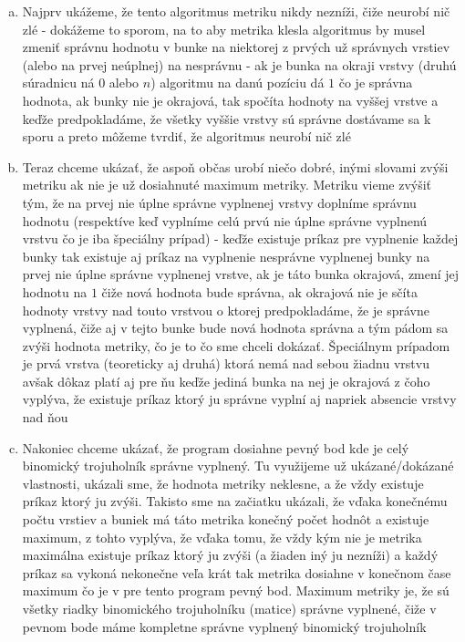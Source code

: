 \documentclass[a4paper]{article}
\begin{document}
\begin{enumerate}[a)]
	\item Najprv ukážeme, že tento algoritmus metriku nikdy nezníži, čiže neurobí nič zlé - dokážeme to sporom, na to aby metrika klesla algoritmus by musel zmeniť správnu hodnotu v bunke na niektorej z prvých už správnych vrstiev (alebo na prvej neúplnej) na nesprávnu - ak je bunka na okraji vrstvy (druhú súradnicu ná $0$ alebo $n$) algoritmu na danú pozíciu dá $1$ čo je správna hodnota, ak bunky nie je okrajová, tak spočíta hodnoty na vyššej vrstve a keďže predpokladáme, že všetky vyššie vrstvy sú správne dostávame sa k sporu a preto môžeme tvrdiť, že algoritmus neurobí nič zlé
	\item Teraz chceme ukázať, že aspoň občas urobí niečo dobré, inými slovami zvýši metriku ak nie je už dosiahnuté maximum metriky. Metriku vieme zvýšiť tým, že na prvej nie úplne správne vyplnenej vrstvy doplníme správnu hodnotu (respektíve keď vyplníme celú prvú nie úplne správne vyplnenú vrstvu čo je iba špeciálny prípad) - keďže existuje príkaz pre vyplnenie každej bunky tak existuje aj príkaz na vyplnenie nesprávne vyplnenej bunky na prvej nie úplne správne vyplnenej vrstve, ak je táto bunka okrajová, zmení jej hodnotu na $1$ čiže nová hodnota bude správna, ak okrajová nie je sčíta hodnoty vrstvy nad touto vrstvou o ktorej predpokladáme, že je správne vyplnená, čiže aj v tejto bunke bude nová hodnota správna a tým pádom sa zvýši hodnota metriky, čo je to čo sme chceli dokázať. Špeciálnym prípadom je prvá vrstva (teoreticky aj druhá) ktorá nemá nad sebou žiadnu vrstvu avšak dôkaz platí aj pre ňu keďže jediná bunka na nej je okrajová z čoho vyplýva, že existuje príkaz ktorý ju správne vyplní aj napriek absencie vrstvy nad ňou 
	\item Nakoniec chceme ukázať, že program dosiahne pevný bod kde je celý binomický trojuholník správne vyplnený. Tu využijeme už ukázané/dokázané vlastnosti, ukázali sme, že hodnota metriky neklesne, a že vždy existuje príkaz ktorý ju zvýši. Takisto sme na začiatku ukázali, že vďaka konečnému počtu vrstiev a buniek má táto metrika konečný počet hodnôt a existuje maximum, z tohto vyplýva, že vďaka tomu, že vždy kým nie je metrika maximálna existuje príkaz ktorý ju zvýši (a žiaden iný ju nezníži) a každý príkaz sa vykoná nekonečne veľa krát tak metrika dosiahne v konečnom čase maximum čo je v pre tento program pevný bod. Maximum metriky je, že sú všetky riadky binomického trojuholníku (matice) správne vyplnené, čiže v pevnom bode máme kompletne správne vyplnený binomický trojuholník  
\end{enumerate}
\end{document}
